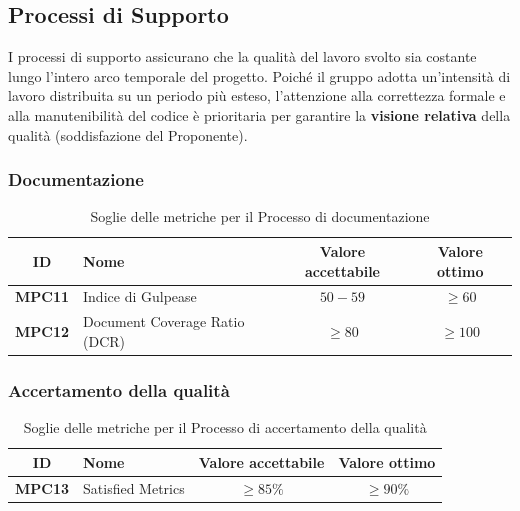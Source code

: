 \documentclass[a4paper,12pt]{article}
\begin{document}
\subsection{Processi di Supporto}\label{sec:processi_supporto}
I processi di supporto assicurano che la qualità del lavoro svolto sia costante lungo l'intero arco temporale del progetto. Poiché il gruppo adotta un'intensità di lavoro distribuita su un periodo più esteso, l'attenzione alla correttezza formale e alla manutenibilità del codice è prioritaria per garantire la \textbf{visione relativa} della qualità (soddisfazione del Proponente).

\subsubsection{Documentazione}\label{sec:documentazione}
\begin{table}[H]
\centering
\renewcommand{\arraystretch}{1.5}
\begin{tabularx}{\textwidth}{|c|Y|c|c|}
\hline
{} \textbf{ID} & \textbf{Nome} & \textbf{Valore accettabile} & \textbf{Valore ottimo} \\ \hline
\textbf{MPC11} & Indice di Gulpease & $50-59$ & $\ge 60$ \\ \hline
\textbf{MPC12} & Document Coverage Ratio (DCR) & $\ge 80$ & $\ge 100$ \\ \hline
\end{tabularx}
\caption{Soglie delle metriche per il Processo di documentazione}
\end{table}

\subsubsection{Accertamento della qualità}\label{sec:accertamento-qualità}
\begin{table}[H]
\centering
\renewcommand{\arraystretch}{1.5}
\begin{tabularx}{\textwidth}{|c|Y|c|c|}
\hline
{} \textbf{ID} & \textbf{Nome} & \textbf{Valore accettabile} & \textbf{Valore ottimo} \\ \hline
\textbf{MPC13} & Satisfied Metrics & $\ge 85\%$ & $\ge 90\%$ \\ \hline
\end{tabularx}
\caption{Soglie delle metriche per il Processo di accertamento della qualità}
\end{table}
\end{document}
